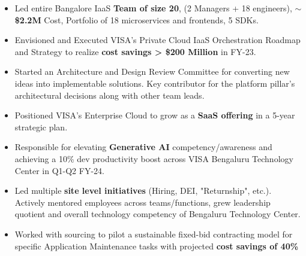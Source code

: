 \documentclass[10pt,a4paper,ragged2e,withhyper]{altacv}
\begin{document}
\begin{paracol}{2}


\begin{itemize}
  \item Led entire Bangalore IaaS \textbf{Team of size 20}, (2 Managers + 18 engineers), \textbf{\(\sim\)\$2.2M} Cost, Portfolio of 18 microservices and frontends, 5 SDKs.
  \item Envisioned and Executed VISA's Private Cloud IaaS Orchestration Roadmap and Strategy to realize \textbf{cost savings > \$200 Million} in FY-23.
  \item Started an Architecture and Design Review Committee for converting new ideas into implementable solutions. Key contributor for the platform pillar's architectural decisions along with other team leads.
  \item Positioned VISA's Enterprise Cloud to grow as a \textbf{SaaS offering} in a 5-year strategic plan.
  \item Responsible for elevating \textbf{Generative AI} competency/awareness and achieving a 10\% dev productivity boost across VISA Bengaluru Technology Center in Q1-Q2 FY-24.
  \item Led multiple \textbf{site level initiatives} (Hiring, DEI, "Returnship", etc.). Actively mentored employees across teams/functions, grew leadership quotient and overall technology competency of Bengaluru Technology Center.
  \item Worked with sourcing to pilot a sustainable fixed-bid contracting model for specific Application Maintenance tasks with projected \textbf{cost savings of 40\%}
\end{itemize}

\divider


\end{paracol}
\end{document}
